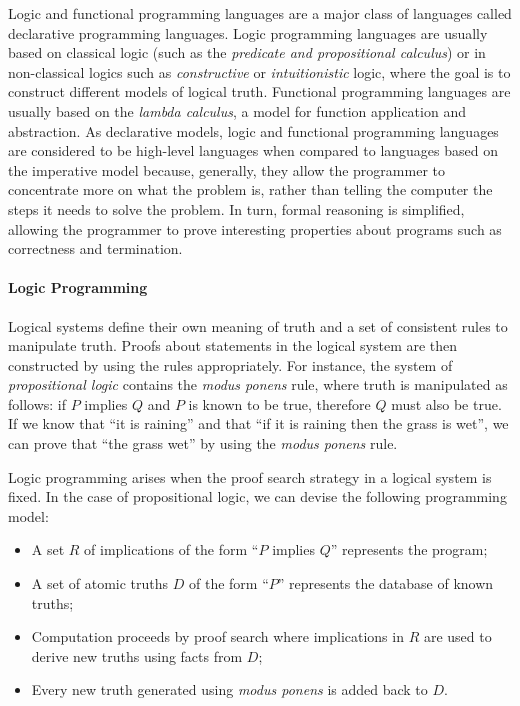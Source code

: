 Logic and functional programming languages are a major class of languages called
declarative programming languages. Logic programming languages are usually based
on classical logic (such as the \emph{predicate and propositional calculus}) or
in non-classical logics such as \emph{constructive} or \emph{intuitionistic}
logic, where the goal is to construct different models of logical truth.
Functional programming languages are usually based on the \emph{lambda
calculus}, a model for function application and abstraction. As declarative
models, logic and functional programming languages are considered to be
high-level languages when compared to languages based on the imperative model
because, generally, they allow the programmer to concentrate more on what the
problem is, rather than telling the computer the steps it needs to solve the
problem. In turn, formal reasoning is simplified, allowing the programmer to
prove interesting properties about programs such as correctness and termination.

\paragraph{Logic Programming}

Logical systems define their own meaning of truth and a set of consistent rules
to manipulate truth. Proofs about statements in the logical system are then
constructed by using the rules appropriately. For instance, the system of
\emph{propositional logic} contains the \emph{modus ponens} rule, where truth is
manipulated as follows: if $P$ implies $Q$ and $P$ is known to be true,
therefore $Q$ must also be true. If we know that ``it is raining'' and that ``if
it is raining then the grass is wet'', we can prove that ``the grass wet'' by
using the \emph{modus ponens} rule.

Logic programming arises when the proof search strategy in a logical system is
fixed. In the case of propositional logic, we can devise the following
programming model:

\begin{itemize}
   \item A set $R$ of implications of the form ``$P$ implies $Q$'' represents the
      program;
   \item A set of atomic truths $D$ of the form ``$P$'' represents the database of
      known truths;
   \item Computation proceeds by proof search where implications in $R$ are used
      to derive new truths using facts from $D$;
   \item Every new truth generated using \emph{modus ponens} is added back to
      $D$.
\end{itemize}

